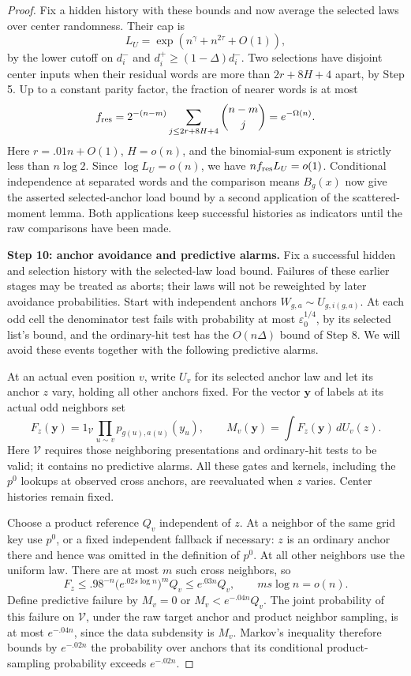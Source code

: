 \begin{proof}
Fix a hidden history with these bounds and now average the selected laws over center randomness. Their cap is
\[
 L_U=\exp(n^\gamma+n^{2\tau}+O(1)),
\]
by the lower cutoff on \(d_i^-\) and \(d_i^+\ge(1-\Delta)d_i^-\).
Two selections have disjoint center inputs when their residual words are more than \(2r+8H+4\) apart, by Step 5. Up to a constant parity factor, the fraction of nearer words is at most
\[
 f_{\rm res}=2^{-(n-m)}
       \sum_{j\le2r+8H+4}\binom{n-m}{j}
       =e^{-\Omega(n)}.
\]
Here \(r=.01n+O(1)\), \(H=o(n)\), and the binomial-sum exponent is strictly less than \(n\log2\). Since \(\log L_U=o(n)\), we have \(nf_{\rm res}L_U=o(1)\). Conditional independence at separated words and the comparison means \(B_g(x)\) now give the asserted selected-anchor load bound by a second application of the scattered-moment lemma. Both applications keep successful histories as indicators until the raw comparisons have been made.

\noindent\textbf{Step 10: anchor avoidance and predictive alarms.}\quad
Fix a successful hidden and selection history with the selected-law load bound. Failures of these earlier stages may be treated as aborts; their laws will not be reweighted by later avoidance probabilities. Start with independent anchors \(W_{g,a}\sim U_{g,i(g,a)}\). At each odd cell the denominator test fails with probability at most \(\varepsilon_0^{1/4}\), by its selected list's bound, and the ordinary-hit test has the \(O(n\Delta)\) bound of Step 8. We will avoid these events together with the following predictive alarms.

At an actual even position \(v\), write \(U_v\) for its selected anchor law and let its anchor \(z\) vary, holding all other anchors fixed. For the vector \(\boldsymbol y\) of labels at its actual odd neighbors set
\[
 F_z(\boldsymbol y)
   =1_{\mathcal V}\prod_{u\sim v}p_{g(u),a(u)}(y_u),
 \qquad
 M_v(\boldsymbol y)=\int F_z(\boldsymbol y)\,dU_v(z).
\]
Here \(\mathcal V\) requires those neighboring presentations and ordinary-hit tests to be valid; it contains no predictive alarms. All these gates and kernels, including the \(p^0\) lookups at observed cross anchors, are reevaluated when \(z\) varies. Center histories remain fixed.

Choose a product reference \(Q_v\) independent of \(z\). At a neighbor of the same grid key use \(p^0\), or a fixed independent fallback if necessary: \(z\) is an ordinary anchor there and hence was omitted in the definition of \(p^0\). At all other neighbors use the uniform law. There are at most \(m\) such cross neighbors, so
\[
 F_z\le .98^{-n}\bigl(e^{.02s\log n}\bigr)^mQ_v
       \le e^{.03n}Q_v,
 \qquad ms\log n=o(n).
\]
Define predictive failure by
\(M_v=0\) or \(M_v<e^{-.04n}Q_v\).
The joint probability of this failure on \(\mathcal V\), under the raw target anchor and product neighbor sampling, is at most \(e^{-.04n}\), since the data subdensity is \(M_v\). Markov's inequality therefore bounds by \(e^{-.02n}\) the probability over anchors that its conditional product-sampling probability exceeds \(e^{-.02n}\).


\end{proof}
